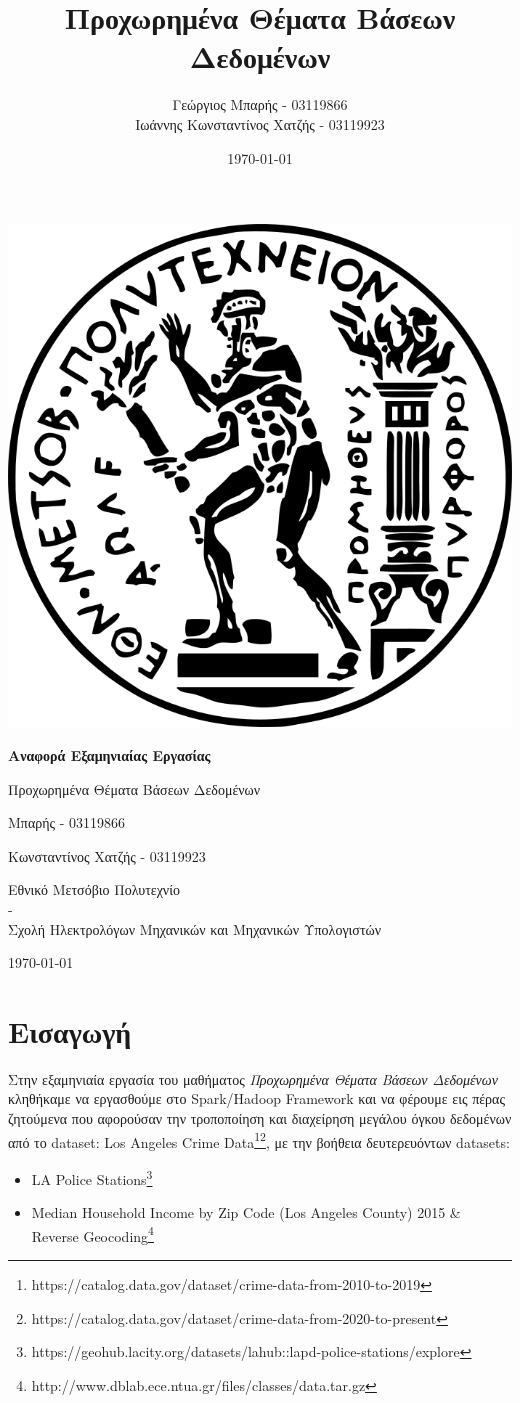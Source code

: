 \documentclass{article}
\title{Προχωρημένα Θέματα Βάσεων Δεδομένων}
\author{Γεώργιος Μπαρής - 03119866\\Ιωάννης Κωνσταντίνος Χατζής - 03119923}
\date{\today}
\begin{document}
\begin{titlepage}
    \centering
    \vspace*{1cm}
    \includegraphics[width=0.45\linewidth]{pyrforos.png}
    \vspace{1.5cm}
    
    {\Huge\bfseries Αναφορά Εξαμηνιαίας Εργασίας\par}
    \vspace{0.3cm}
    {\Large Προχωρημένα Θέματα Βάσεων Δεδομένων\par}
    \vspace{1.5cm}
    {\Large {} Μπαρής - 03119866\par}
    {\Large {} Κωνσταντίνος Χατζής - 03119923\par}

    \vspace{1.5cm}
    {\Large Εθνικό Μετσόβιο Πολυτεχνίο\\-\\Σχολή Ηλεκτρολόγων Μηχανικών και Μηχανικών Υπολογιστών\par}
    \vfill
    {\large \today\par}
\end{titlepage}




\section*{Εισαγωγή}
Στην εξαμηνιαία εργασία του μαθήματος \textit{Προχωρημένα Θέματα Βάσεων Δεδομένων} κληθήκαμε να εργασθούμε στο Spark/Hadoop Framework  και να φέρουμε εις πέρας ζητούμενα που αφορούσαν την τροποποίηση και διαχείρηση μεγάλου όγκου δεδομένων από το  {dataset: Los Angeles Crime Data}\footnote{https://catalog.data.gov/dataset/crime-data-from-2010-to-2019}\footnote{https://catalog.data.gov/dataset/crime-data-from-2020-to-present},  με την βοήθεια δευτερευόντων  datasets:
\begin{itemize}
    \item   LA Police Stations\footnote{https://geohub.lacity.org/datasets/lahub::lapd-police-stations/explore}
    \item   Median Household Income by Zip Code (Los Angeles County) 2015 \& Reverse Geocoding\footnote{http://www.dblab.ece.ntua.gr/files/classes/data.tar.gz} 
\end{itemize}
\end{document}
